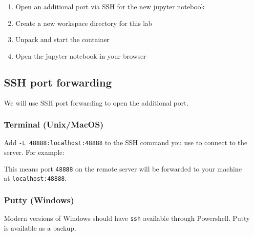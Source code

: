 \documentclass[
]{book}
\newenvironment{Shaded}{\begin{snugshade}}{\end{snugshade}}
\newcommand{\AttributeTok}[1]{\textcolor[rgb]{0.13,0.29,0.53}{#1}}
\newcommand{\FunctionTok}[1]{\textcolor[rgb]{0.13,0.29,0.53}{\textbf{#1}}}
\newcommand{\NormalTok}[1]{#1}
\newcommand{\VariableTok}[1]{\textcolor[rgb]{0.00,0.00,0.00}{#1}}
\providecommand{\tightlist}{%
  \setlength{\itemsep}{0pt}\setlength{\parskip}{0pt}}
\begin{document}
\begin{enumerate}
\def\labelenumi{\arabic{enumi}.}
\tightlist
\item
  Open an additional port via SSH for the new jupyter notebook
\item
  Create a new workspace directory for this lab
\item
  Unpack and start the container
\item
  Open the jupyter notebook in your browser
\end{enumerate}

\subsection{SSH port forwarding}\label{ssh-port-forwarding}

We will use SSH port forwarding to open the additional port.

\subsubsection{Terminal (Unix/MacOS)}\label{terminal-unixmacos}

Add \texttt{-L\ 48888:localhost:48888} to the SSH command you use to connect to the server. For example:

\begin{Shaded}
\end{Shaded}

This means port \texttt{48888} on the remote server will be forwarded to your machine at \texttt{localhost:48888}.

\subsubsection{Putty (Windows)}\label{putty-windows}

Modern versions of Windows should have \texttt{ssh} available through Powershell. Putty is available as a backup.
\end{document}
